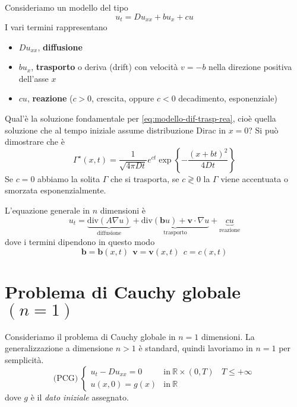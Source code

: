 \documentclass[10pt,a4paper,twoside,openright]{book}
\begin{document}
Consideriamo un modello del tipo
\begin{equation}
u_{t} =Du_{xx} +bu_{x} +cu
\label{eq:modello-dif-trasp-rea}
\end{equation}
I vari termini rappresentano
\begin{itemize}
\item $Du_{xx}$, \textbf{diffusione}
\item $bu_{x}$, \textbf{trasporto} o deriva (drift) con velocità $v=-b$ nella direzione positiva dell'asse $x$
\item $cu$, \textbf{reazione} ($c >0$, crescita, oppure $c< 0$ decadimento, esponenziale)
\end{itemize}

Qual'è la soluzione fondamentale per \eqref{eq:modello-dif-trasp-rea}, cioè quella soluzione che al tempo iniziale assume distribuzione Dirac in $x=0$? Si può dimostrare che è
\begin{equation}
\boxed{\Gamma ^{\star }(x,t) =\frac{1}{\sqrt{4\pi Dt}} e^{ct}\exp\left\{-\frac{(x+bt)^{2}}{4Dt}\right\}}
\end{equation}
Se $c=0$ abbiamo la solita $\Gamma $ che si trasporta, se $c\gtrless 0$ la $\Gamma $ viene accentuata o smorzata esponenzialmente.

L'equazione generale in $n$ dimensioni è
\begin{equation*}
u_{t} = \underbrace{\mathrm{div}(A \nabla u)}_{\text{diffusione}} + \underbrace{\mathrm{div}(\mathbf{b} u) +\mathbf{v} \cdot\nabla u}_{\text{trasporto}} + \underbrace{cu}_{\text{reazione}}
\end{equation*}
dove i termini dipendono in questo modo
\begin{equation*}
\mathbf{b} =\mathbf{b}(x,t) \ \ \mathbf{v} =\mathbf{v}(x,t) \ \ c=c(x,t)
\end{equation*}
\section{Problema di Cauchy globale \texorpdfstring{$(n=1)$}{n=1}}

Consideriamo il problema di Cauchy globale in $n=1$ dimensioni. La generalizzazione a dimensione $n >1$ è standard, quindi lavoriamo in $n=1$ per semplicità.
\begin{equation*}
\text{(PCG)} \ \begin{cases}
u_{t} -Du_{xx} =0 & \text{in} \ \mathbb{R} \times (0,T) \ \ \ \ T\leqslant +\infty \\
u(x,0) =g(x) & \text{in} \ \mathbb{R}
\end{cases}
\end{equation*}
dove $g$ è il \textit{dato iniziale} assegnato.
\end{document}
